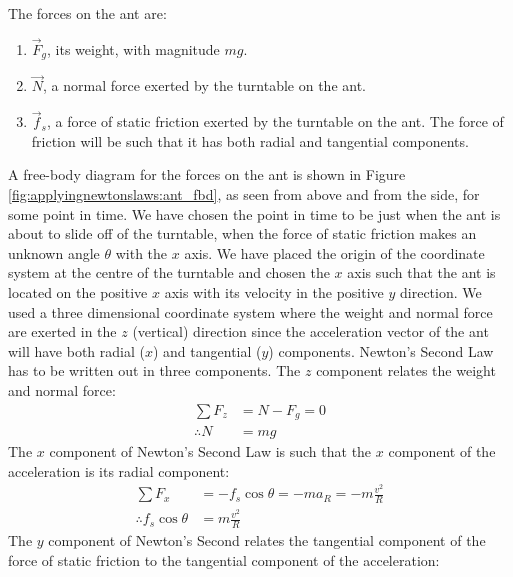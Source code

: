 \begin{example}
The forces on the ant are:
\begin{enumerate}
\item $\vec F_g$, its weight, with magnitude $mg$.
\item $\vec N$, a normal force exerted by the turntable on the ant.
\item $\vec f_s$, a force of static friction exerted by the turntable on the ant. The force of friction will be such that it has both radial and tangential components.
\end{enumerate}
A free-body diagram for the forces on the ant is shown in Figure \ref{fig:applyingnewtonslaws:ant_fbd}, as seen from above and from the side, for some point in time. We have chosen the point in time to be just when the ant is about to slide off of the turntable, when the force of static friction makes an unknown angle $\theta$ with the $x$ axis. We have placed the origin of the coordinate system at the centre of the turntable and chosen the $x$ axis such that the ant is located on the positive $x$ axis with its velocity in the positive $y$ direction. We used a three dimensional coordinate system where the weight and normal force are exerted in the $z$ (vertical) direction since the acceleration vector of the ant will have both radial ($x$) and tangential ($y$) components.
Newton's Second Law has to be written out in three components. The $z$ component relates the weight and normal force:
\begin{align*}
\sum F_z &= N - F_g = 0\\
\therefore N&=mg
\end{align*}
The $x$ component of Newton's Second Law is such that the $x$ component of the acceleration is its radial component:
\begin{align*}
\sum F_x &= -f_s\cos\theta = -ma_R = -m\frac{v^2}{R}\\
\therefore f_s\cos\theta &= m\frac{v^2}{R}
\end{align*}
The $y$ component of Newton's Second relates the tangential component of the force of static friction to the tangential component of the acceleration:

\end{example}

